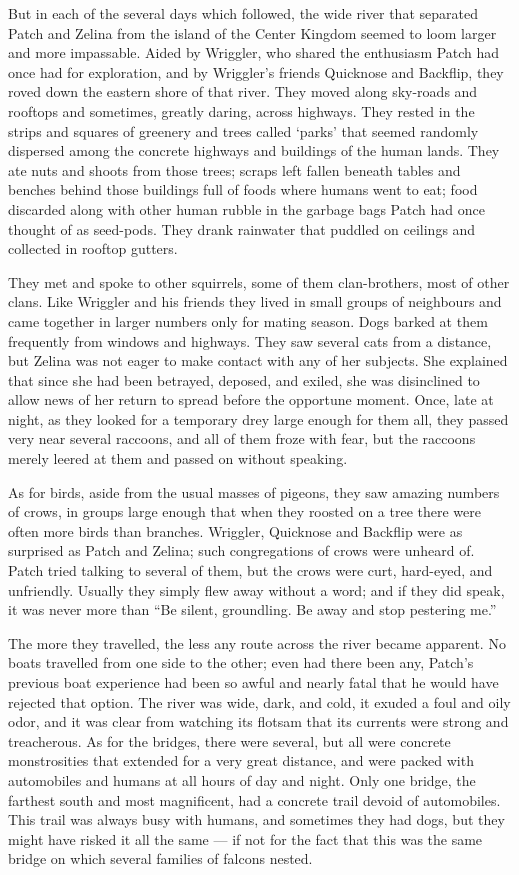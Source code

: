 \documentclass[ebook,oneside,openany,12pt]{memoir}
\begin{document}
But in each of the several days which followed, the wide river that
separated Patch and Zelina from the island of the Center Kingdom
seemed to loom larger and more impassable. Aided by Wriggler, who
shared the enthusiasm Patch had once had for exploration, and by
Wriggler’s friends Quicknose and Backflip, they roved down the eastern
shore of that river. They moved along sky-roads and rooftops and
sometimes, greatly daring, across highways. They rested in the strips
and squares of greenery and trees called ‘parks’ that seemed randomly
dispersed among the concrete highways and buildings of the human
lands. They ate nuts and shoots from those trees; scraps left fallen
beneath tables and benches behind those buildings full of foods where
humans went to eat; food discarded along with other human rubble in
the garbage bags Patch had once thought of as seed-pods. They drank
rainwater that puddled on ceilings and collected in rooftop gutters.

They met and spoke to other squirrels, some of them clan-brothers,
most of other clans. Like Wriggler and his friends they lived in small
groups of neighbours and came together in larger numbers only for
mating season. Dogs barked at them frequently from windows and
highways. They saw several cats from a distance, but Zelina was not
eager to make contact with any of her subjects. She explained that
since she had been betrayed, deposed, and exiled, she was disinclined
to allow news of her return to spread before the opportune
moment. Once, late at night, as they looked for a temporary drey large
enough for them all, they passed very near several raccoons, and all
of them froze with fear, but the raccoons merely leered at them and
passed on without speaking.

As for birds, aside from the usual masses of pigeons, they saw amazing
numbers of crows, in groups large enough that when they roosted on a
tree there were often more birds than branches. Wriggler, Quicknose
and Backflip were as surprised as Patch and Zelina; such congregations
of crows were unheard of. Patch tried talking to several of them, but
the crows were curt, hard-eyed, and unfriendly. Usually they simply
flew away without a word; and if they did speak, it was never more
than “Be silent, groundling. Be away and stop pestering me.”

The more they travelled, the less any route across the river became
apparent. No boats travelled from one side to the other; even had
there been any, Patch’s previous boat experience had been so awful and
nearly fatal that he would have rejected that option. The river was
wide, dark, and cold, it exuded a foul and oily odor, and it was clear
from watching its flotsam that its currents were strong and
treacherous. As for the bridges, there were several, but all were
concrete monstrosities that extended for a very great distance, and
were packed with automobiles and humans at all hours of day and
night. Only one bridge, the farthest south and most magnificent, had a
concrete trail devoid of automobiles. This trail was always busy with
humans, and sometimes they had dogs, but they might have risked it all
the same — if not for the fact that this was the same bridge on which
several families of falcons nested.
\end{document}

